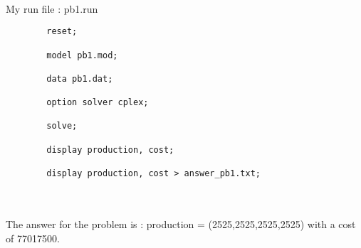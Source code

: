\documentclass{article}
\newenvironment{DDbox}[1]{
\begin{lrbox}{\BBbox}
    \begin{minipage}{\linewidth}}
{\end{minipage}
\end{lrbox}\noindent\colorbox{Zgris}{\usebox{\BBbox}} \\
[.5cm]}
\begin{document}
\\
My run file : pb1.run
\\
\begin{DDbox}{\linewidth}
    \begin{verbatim}
        reset;

        model pb1.mod;

        data pb1.dat;

        option solver cplex;

        solve;

        display production, cost;

        display production, cost > answer_pb1.txt;
    \end{verbatim}
\end{DDbox}
\\
The answer for the problem is : production = (2525,2525,2525,2525) with a cost of 77017500.
\end{document}
